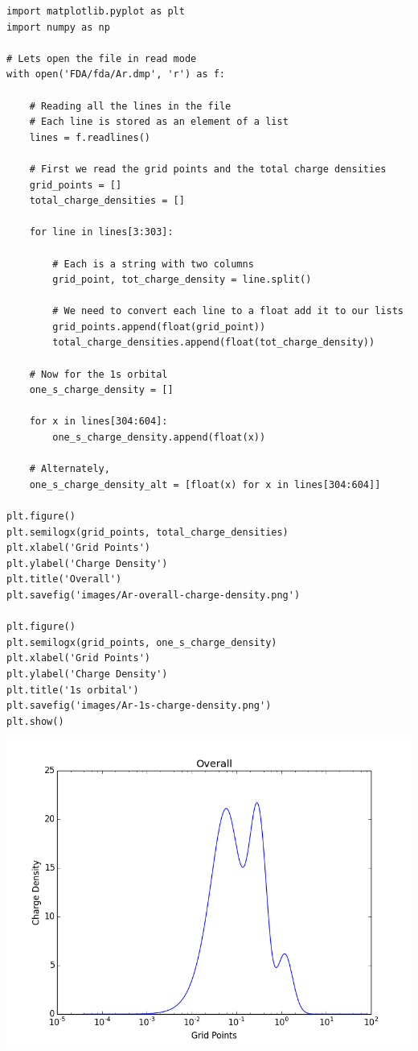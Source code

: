 \documentclass[11pt]{article}
\begin{document}
\begin{verbatim}
import matplotlib.pyplot as plt
import numpy as np

# Lets open the file in read mode
with open('FDA/fda/Ar.dmp', 'r') as f:

    # Reading all the lines in the file
    # Each line is stored as an element of a list
    lines = f.readlines()

    # First we read the grid points and the total charge densities
    grid_points = []
    total_charge_densities = []

    for line in lines[3:303]:

        # Each is a string with two columns
        grid_point, tot_charge_density = line.split()

        # We need to convert each line to a float add it to our lists
        grid_points.append(float(grid_point))
        total_charge_densities.append(float(tot_charge_density))
    
    # Now for the 1s orbital
    one_s_charge_density = []
    
    for x in lines[304:604]:
        one_s_charge_density.append(float(x))
 
    # Alternately,
    one_s_charge_density_alt = [float(x) for x in lines[304:604]]

plt.figure()
plt.semilogx(grid_points, total_charge_densities)
plt.xlabel('Grid Points')
plt.ylabel('Charge Density')
plt.title('Overall')
plt.savefig('images/Ar-overall-charge-density.png')

plt.figure()
plt.semilogx(grid_points, one_s_charge_density)
plt.xlabel('Grid Points')
plt.ylabel('Charge Density')
plt.title('1s orbital')
plt.savefig('images/Ar-1s-charge-density.png')
plt.show()
\end{verbatim}

\includegraphics[width=.9\linewidth]{./images/Ar-overall-charge-density.png}
\end{document}
